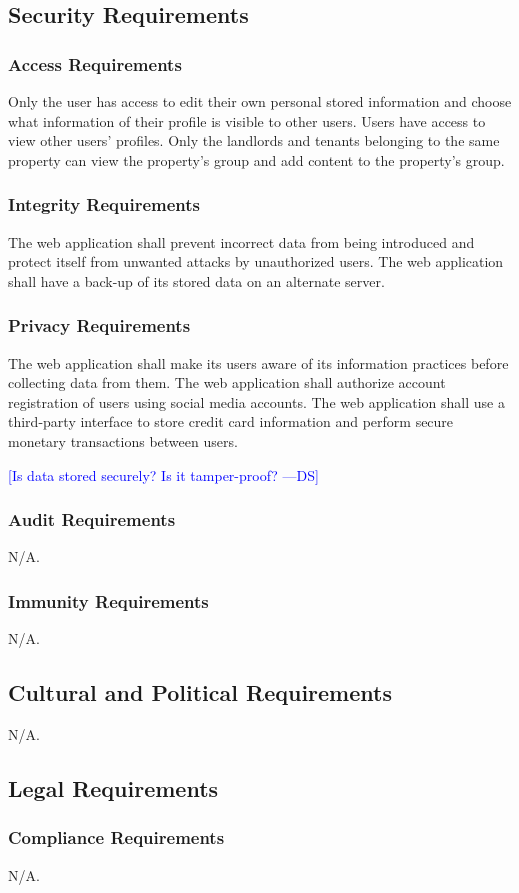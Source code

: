 \documentclass[12pt]{article}
\newcommand{\authornote}[3]{\textcolor{#1}{[#3 ---#2]}}
\newcommand{\authornote}[3]{}
\newcommand{\ds}[1]{\authornote{blue}{DS}{#1}}
\begin{document}
{\subsection{Security Requirements}
\subsubsection{Access Requirements}
Only the user has access to edit their own personal stored information and 
choose what information of their profile is visible to other users. Users have 
access to view other users' profiles. Only the landlords and tenants belonging 
to the same property can view the property's group and add content to the 
property's group.
\subsubsection{Integrity Requirements}
The web application shall prevent incorrect data from being introduced and 
protect itself from unwanted attacks by unauthorized users. The web application 
shall have a back-up of its stored data on an alternate server.
\subsubsection{Privacy Requirements}
The web application shall make its users aware of its information practices 
before collecting data from them. The web application shall authorize account 
registration of users using social media accounts. The web application shall use 
a third-party interface to store credit card information and perform secure 
monetary transactions between users.

\ds{Is data stored securely? Is it tamper-proof?}
\subsubsection{Audit Requirements}
N/A.
\subsubsection{Immunity Requirements}
N/A.
\subsection{Cultural and Political Requirements}
N/A.
\subsection{Legal Requirements}
\subsubsection{Compliance Requirements}
N/A.
}
\end{document}
